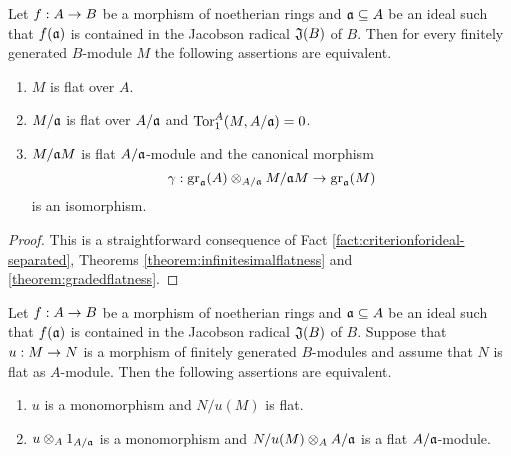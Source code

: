 \begin{corollary}\label{corollary:localjacobsonflatness}
Let $f:A\rightarrow B$ be a morphism of noetherian rings and $\mathfrak{a}\subseteq A$ be an ideal such that $f(\mathfrak{a})$ is contained in the Jacobson radical $\mathfrak{J}(B)$ of $B$. Then for every finitely generated $B$-module $M$ the following assertions are equivalent.
\begin{enumerate}[label=\emph{\textbf{(\roman*)}}, leftmargin=*]
\item $M$ is flat over $A$.
\item $M/\mathfrak{a}$ is flat over $A/\mathfrak{a}$ and $\mathrm{Tor}^A_1(M,A/\mathfrak{a})=0$.
\item $M/\mathfrak{a}M$ is flat $A/\mathfrak{a}$-module and the canonical morphism
$$\gamma:\mathrm{gr}_{\mathfrak{a}}(A)\otimes_{A/\mathfrak{a}}M/\mathfrak{a}M\rightarrow \mathrm{gr}_{\mathfrak{a}}(M)$$
is an isomorphism.
\end{enumerate}
\end{corollary}
\begin{proof}
This is a straightforward consequence of Fact \ref{fact:criterionforideal-separated}, Theorems \ref{theorem:infinitesimalflatness} and \ref{theorem:gradedflatness}.
\end{proof}
\begin{corollary}
Let $f:A\rightarrow B$ be a morphism of noetherian rings and $\mathfrak{a}\subseteq A$ be an ideal such that $f(\mathfrak{a})$ is contained in the Jacobson radical $\mathfrak{J}(B)$ of $B$. Suppose that $u:M\rightarrow N$ is a morphism of finitely generated $B$-modules and assume that $N$ is flat as $A$-module. Then the following assertions are equivalent.
\begin{enumerate}[label=\emph{\textbf{(\roman*)}}, leftmargin=*]
\item $u$ is a monomorphism and $N/u(M)$ is flat.
\item $u\otimes_A1_{A/\mathfrak{a}}$ is a monomorphism and $N/u(M)\otimes_AA/\mathfrak{a}$ is a flat $A/\mathfrak{a}$-module.
\end{enumerate}
\end{corollary}

